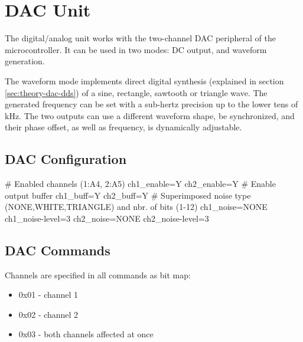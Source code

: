 \section{DAC Unit}

The digital/analog unit works with the two-channel \gls{DAC} peripheral of the microcontroller. It can be used in two modes: \gls{DC} output, and waveform generation.

The waveform mode implements direct digital synthesis (explained in section \ref{sec:theory-dac-dds}) of a sine, rectangle, sawtooth or triangle wave. The generated frequency can be set with a sub-hertz precision up to the lower tens of kHz. The two outputs can use a different waveform shape, be synchronized, and their phase offset, as well as frequency, is dynamically adjustable.


\subsection{DAC Configuration}

\begin{inicode}
# Enabled channels (1:A4, 2:A5)
ch1_enable=Y
ch2_enable=Y
# Enable output buffer
ch1_buff=Y
ch2_buff=Y
# Superimposed noise type (NONE,WHITE,TRIANGLE) and nbr. of bits (1-12)
ch1_noise=NONE
ch1_noise-level=3
ch2_noise=NONE
ch2_noise-level=3
\end{inicode}

\subsection{DAC Commands}

Channels are specified in all commands as bit map:

\begin{itemize}[nosep]
	\item 0x01 - channel 1
	\item 0x02 - channel 2
	\item 0x03 - both channels affected at once
\end{itemize}

